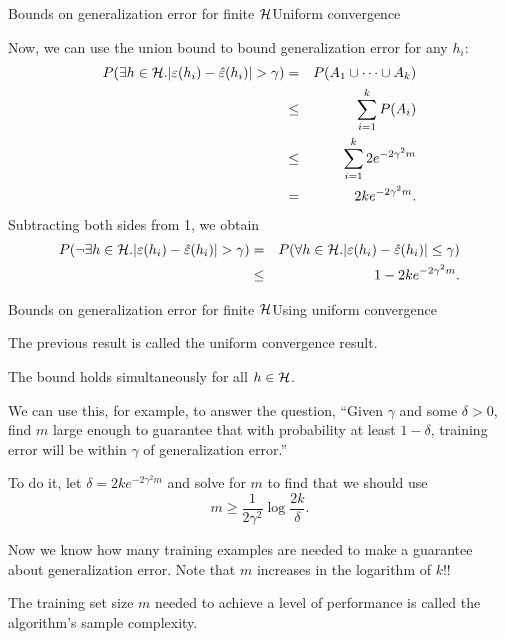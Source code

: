 \documentclass{beamer}
\begin{document}
\begin{frame}{Bounds on generalization error for finite $\cal H$}{Uniform convergence}

  Now, we can use the union bound to bound generalization error for
  \alert{any} $h_i$:
  \begin{eqnarray*}
    P(\exists h \in {\cal H}.|\varepsilon(h_i)-\hat{\varepsilon}(h_i)|>\gamma)
    & = & P(A_1 \cup \cdots \cup A_k) \\
    & \le & \sum_{i=1}^k P(A_i) \\
    & \le & \sum_{i=1}^k 2 e^{-2\gamma^2m} \\
    & = & 2 k e^{-2\gamma^2 m} .
  \end{eqnarray*}
  Subtracting both sides from 1, we obtain
  \begin{eqnarray*}
    P(\neg \exists h \in {\cal H}.|\varepsilon(h_i)-\hat{\varepsilon}(h_i)|
    > \gamma) & = & P(\forall h\in {\cal H}.|\varepsilon(h_i) - \hat{\varepsilon}(h_i)| \le \gamma) \\
    & \le & 1 - 2 k e^{-2\gamma^2 m} .
  \end{eqnarray*}
    
\end{frame}


\begin{frame}{Bounds on generalization error for finite $\cal H$}{Using uniform convergence}

  The previous result is called the \alert{uniform convergence} result.

  \medskip

  The bound holds simultaneously for all $h \in {\cal H}$.

  \medskip

  We can use this, for example, to answer the question, ``Given
  $\gamma$ and some $\delta>0$, find $m$ large enough to guarantee
  that with probability at least $1-\delta$, training error will be
  within $\gamma$ of generalization error.''

  \medskip

  To do it, let $\delta = 2k e^{-2\gamma^2 m}$ and solve for $m$ to find that
  we should use
  \[ m \ge \frac{1}{2\gamma^2}\log\frac{2k}{\delta} .\]

  Now we know \alert{how many training examples are needed to make a
    guarantee about generalization error}. Note that $m$ increases in
  the \alert{logarithm of $k$}!!

  \medskip

  The training set size $m$ needed to achieve a level of performance
  is called the algorithm's \alert{sample complexity}.
  
\end{frame}
\end{document}
